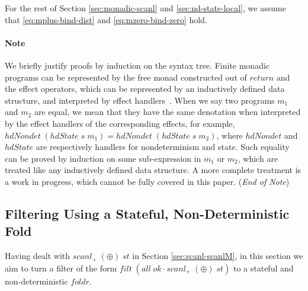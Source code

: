 \documentclass{llncs}
\newcommand{\Varid}[1]{\mathit{#1}}
\let\Varid\mathit
\begin{document}
For the rest of Section \ref{sec:monadic-scanl} and \ref{sec:nd-state-local}, we assume that \eqref{eq:mplus-bind-dist} and \eqref{eq:mzero-bind-zero} hold.

\paragraph{Note} We briefly justify proofs by induction on the syntax tree.
Finite monadic programs can be represented by the free monad constructed out of \ensuremath{\Varid{return}} and the effect operators, which can be represented by an inductively defined data structure, and interpreted by effect handlers~\cite{Kiselyov:13:Extensible, KiselyovIshii:15:Freer}.
When we say two programs \ensuremath{\Varid{m}_{1}} and \ensuremath{\Varid{m}_{2}} are equal, we mean that they have the same denotation when interpreted by the effect handlers of the corresponding effects, for example, \ensuremath{\Varid{hdNondet}\;(\Varid{hdState}\;\Varid{s}\;\Varid{m}_{1})\mathrel{=}\Varid{hdNondet}\;(\Varid{hdState}\;\Varid{s}\;\Varid{m}_{2})}, where \ensuremath{\Varid{hdNondet}} and \ensuremath{\Varid{hdState}} are respectively handlers for nondeterminism and state.
Such equality can be proved by induction on some sub-expression in \ensuremath{\Varid{m}_{1}} or \ensuremath{\Varid{m}_{2}}, which are treated like any inductively defined data structure.
A more complete treatment is a work in progress, which cannot be fully covered in this paper.
({\em End of Note})



\subsection{Filtering Using a Stateful, Non-Deterministic Fold}
\label{sec:monadic-state-passing-local}

Having dealt with \ensuremath{\Varid{scanl}_{+}\;(\oplus)\;\Varid{st}} in Section \ref{sec:scanl-scanlM},
in this section we aim to turn a filter of the form \ensuremath{\Varid{filt}\;(\Varid{all}\;\Varid{ok}\mathbin{\cdot}\Varid{scanl}_{+}\;(\oplus)\;\Varid{st})} to a stateful and non-deterministic \ensuremath{\Varid{foldr}}.
\end{document}
